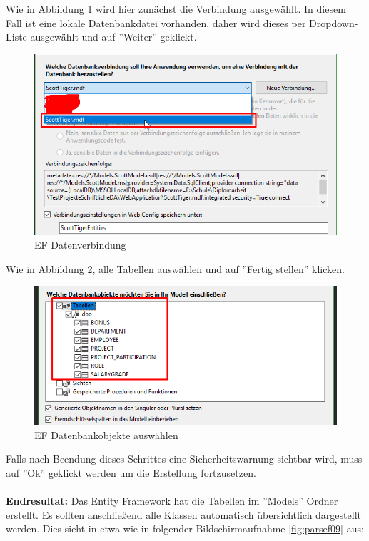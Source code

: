 Wie in Abbildung \ref{fig:parsef06} wird hier zunächst die Verbindung ausgewählt. In diesem Fall ist eine lokale Datenbankdatei vorhanden, daher wird dieses per Dropdown-Liste ausgewählt und auf ''Weiter'' geklickt.
\begin{figure}[H]
    \centering
    \includegraphics[width=\textwidth]{images/Parser_EFUse06}
    \caption{EF Datenverbindung}
    \label{fig:parsef06}
\end{figure} 
Wie in Abbildung \ref{fig:parsef07}, alle Tabellen auswählen und auf ''Fertig stellen'' klicken. 
\begin{figure}[H]
    \centering
    \includegraphics[width=\textwidth]{images/Parser_EFUse07}
    \caption{EF Datenbankobjekte auswählen}
    \label{fig:parsef07}
\end{figure} 
Falls nach Beendung dieses Schrittes eine Sicherheitswarnung sichtbar wird, muss auf ''Ok'' geklickt werden um die Erstellung fortzusetzen. \\ \\
\textbf{Endresultat:} Das Entity Framework hat die Tabellen im ''Models'' Ordner erstellt. Es sollten anschließend alle Klassen automatisch übersichtlich dargestellt werden. Dies sieht in etwa wie in folgender Bildschirmaufnahme \ref{fig:parsef09} aus:
